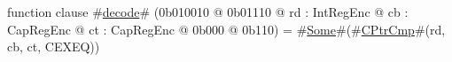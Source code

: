 function clause #\hyperref[zdecode]{decode}# (0b010010 @ 0b01110 @ rd : IntRegEnc @ cb : CapRegEnc @ ct : CapRegEnc @ 0b000 @ 0b110) = #\hyperref[zSome]{Some}#(#\hyperref[zCPtrCmp]{CPtrCmp}#(rd, cb, ct, CEXEQ))
